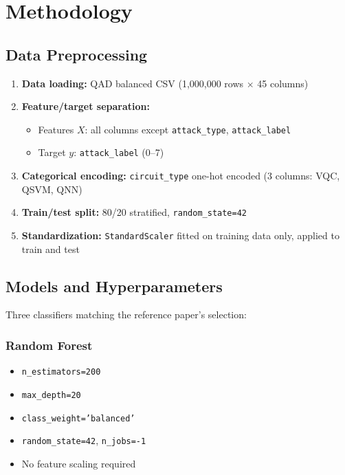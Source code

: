 \section{Methodology}
\label{sec:methodology}

\subsection{Data Preprocessing}
\label{sec:preprocessing}

\begin{enumerate}
    \item \textbf{Data loading:} QAD balanced CSV (1,000,000 rows $\times$ 45 columns)
    \item \textbf{Feature/target separation:} 
    \begin{itemize}
        \item Features $X$: all columns except \texttt{attack\_type}, \texttt{attack\_label}
        \item Target $y$: \texttt{attack\_label} (0--7)
    \end{itemize}
    \item \textbf{Categorical encoding:} \texttt{circuit\_type} one-hot encoded (3 columns: VQC, QSVM, QNN)
    \item \textbf{Train/test split:} 80/20 stratified, \texttt{random\_state=42}
    \item \textbf{Standardization:} \texttt{StandardScaler} fitted on training data only, applied to train and test
\end{enumerate}

\subsection{Models and Hyperparameters}
\label{sec:models}

Three classifiers matching the reference paper's selection:

\subsubsection{Random Forest}
\begin{itemize}
    \item \texttt{n\_estimators=200}
    \item \texttt{max\_depth=20}
    \item \texttt{class\_weight='balanced'}
    \item \texttt{random\_state=42}, \texttt{n\_jobs=-1}
    \item No feature scaling required
\end{itemize}

